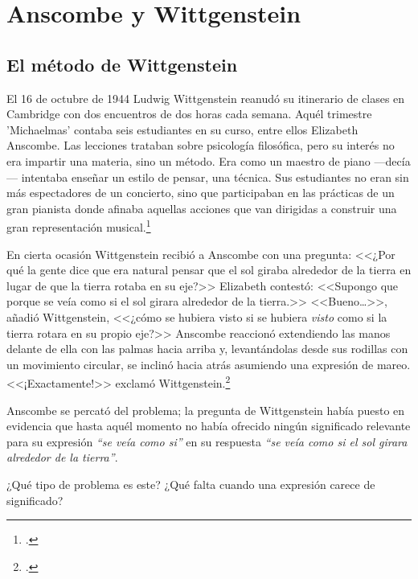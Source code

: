 \section{Anscombe y Wittgenstein}

\subsection{El método de Wittgenstein}
El 16 de octubre de 1944 Ludwig Wittgenstein reanudó su itinerario de clases en
Cambridge con dos encuentros de dos horas cada semana. Aquél trimestre
'Michaelmas' contaba seis estudiantes en su curso, entre ellos Elizabeth
Anscombe. Las lecciones trataban sobre psicología filosófica, pero su interés no
era impartir una materia, sino un método. Era como un maestro de piano
---decía--- intentaba enseñar un estilo de pensar, una técnica. Sus estudiantes
no eran sin más espectadores de un concierto, sino que participaban en las
prácticas de un gran pianista donde afinaba aquellas acciones que van dirigidas
a construir una gran representación musical.\footcite[p.~357]{pubnpriv}
 
En cierta ocasión Wittgenstein recibió a Anscombe con una pregunta: <<¿Por qué
la gente dice que era natural pensar que el sol giraba alrededor de la tierra en
lugar de que la tierra rotaba en su eje?>> Elizabeth contestó: <<Supongo que
porque se veía como si el sol girara alrededor de la tierra.>> <<Bueno\ldots>>,
añadió Wittgenstein, <<¿cómo se hubiera visto si se hubiera \emph{visto} como si
la tierra rotara en su propio eje?>> Anscombe reaccionó extendiendo las manos
delante de ella con las palmas hacia arriba y, levantándolas desde sus rodillas
con un movimiento circular, se inclinó hacia atrás asumiendo una expresión de
mareo. <<¡Exactamente!>> exclamó Wittgenstein.\footcite[cf.~][p.~151]{IWT}

Anscombe se percató del problema; la pregunta de Wittgenstein había puesto en
evidencia que hasta aquél momento no había ofrecido ningún significado relevante
para su expresión \emph{``se veía como si''} en su respuesta \emph{``se veía
  como si el sol girara alrededor de la tierra''}.
 
¿Qué tipo de problema es este? ¿Qué falta cuando una expresión carece de
significado?


